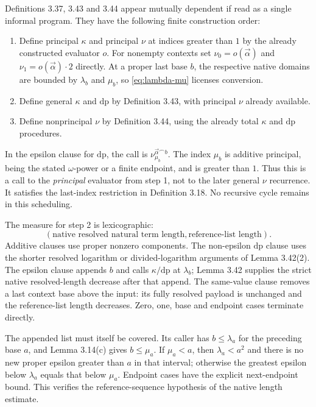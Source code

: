 \documentclass[11pt]{article}
\begin{document}
Definitions 3.37, 3.43 and 3.44 appear mutually dependent if read
as a single informal program. They have the following finite
construction order:
\begin{enumerate}
\item Define principal $\kappa$ and principal $\nu$ at indices
greater than $1$ by the already constructed evaluator $o$.
For nonempty contexts set $\nu_0=o(\vec{\alpha})$ and
$\nu_1=o(\vec{\alpha})\cdot2$ directly. At a proper last
base $b$, the respective native domains are bounded by
$\lambda_b$ and $\mu_b$, so \eqref{eq:lambda-mu} licenses conversion.
\item Define general $\kappa$ and $\mathrm{dp}$ by Definition 3.43,
with principal $\nu$ already available.
\item Define nonprincipal $\nu$ by Definition 3.44, using the
already total $\kappa$ and $\mathrm{dp}$ procedures.
\end{enumerate}
In the epsilon clause for $\mathrm{dp}$, the call is
$\nu^{\vec{\alpha}\frown b}_{\mu_b}$. The index $\mu_b$ is
additive principal, being the stated $\omega$-power or a finite
endpoint, and is greater than $1$. Thus this is a call to the
\emph{principal} evaluator from step 1, not to the later general
$\nu$ recurrence. It satisfies the last-index restriction in
Definition 3.18. No recursive cycle remains in this scheduling.

The measure for step 2 is lexicographic:
\begin{equation}\label{eq:length-measure}
 (\text{native resolved natural term length},
   \text{reference-list length}).
\end{equation}
Additive clauses use proper nonzero components. The non-epsilon
$\mathrm{dp}$ clause uses the shorter resolved logarithm or
divided-logarithm arguments of Lemma 3.42(2). The epsilon clause
appends $b$ and calls $\kappa/\mathrm{dp}$ at $\lambda_b$;
Lemma 3.42 supplies the strict native resolved-length decrease
after that append. The same-value clause removes a last context
base above the input: its fully resolved payload is unchanged and
the reference-list length decreases. Zero, one, base and endpoint
cases terminate directly.

The appended list must itself be covered. Its caller has
$b\le\lambda_a$ for the preceding base $a$, and Lemma 3.14(c)
gives $b\le\mu_a$. If $\mu_a<a$, then $\lambda_a<a^2$ and
there is no new proper epsilon greater than $a$ in that interval;
otherwise the greatest epsilon below $\lambda_a$ equals that below
$\mu_a$. Endpoint cases have the explicit next-endpoint bound.
This verifies the reference-sequence hypothesis of the native
length estimate.
\end{document}
